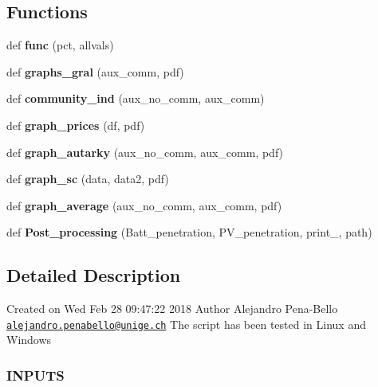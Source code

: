 \subsection*{Functions}
\begin{DoxyCompactItemize}
\item 
\mbox{\label{namespace_post__processing_a39280b58440579932cea3462d32e203e}} 
def {\bfseries func} (pct, allvals)
\item 
\mbox{\label{namespace_post__processing_aede6b9c19cdfa05c1de6927675038031}} 
def {\bfseries graphs\+\_\+gral} (aux\+\_\+comm, pdf)
\item 
\mbox{\label{namespace_post__processing_aee033cc3588599f12962fcb55d38fc35}} 
def {\bfseries community\+\_\+ind} (aux\+\_\+no\+\_\+comm, aux\+\_\+comm)
\item 
\mbox{\label{namespace_post__processing_a24f1c139634454490de9d7f45386dbec}} 
def {\bfseries graph\+\_\+prices} (df, pdf)
\item 
\mbox{\label{namespace_post__processing_aa778292186879f2f4c1db1e1b746cfec}} 
def {\bfseries graph\+\_\+autarky} (aux\+\_\+no\+\_\+comm, aux\+\_\+comm, pdf)
\item 
\mbox{\label{namespace_post__processing_aa3b56424015674166399052102f5a815}} 
def {\bfseries graph\+\_\+sc} (data, data2, pdf)
\item 
\mbox{\label{namespace_post__processing_ab54f23268ecc8bb82be2acb6e14543f0}} 
def {\bfseries graph\+\_\+average} (aux\+\_\+no\+\_\+comm, aux\+\_\+comm, pdf)
\item 
\mbox{\label{namespace_post__processing_a13c5c0ce1e1048e4282a386e2567f773}} 
def {\bfseries Post\+\_\+processing} (Batt\+\_\+penetration, P\+V\+\_\+penetration, print\+\_\+, path)
\end{DoxyCompactItemize}


\subsection{Detailed Description}
Created on Wed Feb 28 09\+:47\+:22 2018 Author Alejandro Pena-\/\+Bello \href{mailto:alejandro.penabello@unige.ch}{\tt alejandro.\+penabello@unige.\+ch} The script has been tested in Linux and Windows \subsubsection*{I\+N\+P\+U\+TS }

